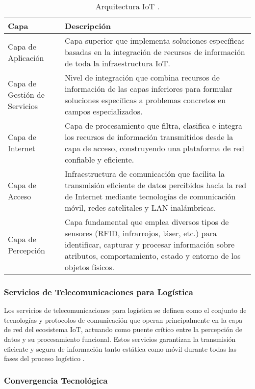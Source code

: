 \begin{table}[H]
\centering
\caption{Arquitectura IoT \cite{WebRef13248}.}
\label{tab:arquitectura_iot}
\begin{tabular}{@{}p{4cm}p{8cm}@{}}
\toprule
\textbf{Capa} & \textbf{Descripción} \\
\midrule
Capa de Aplicación & Capa superior que implementa soluciones específicas basadas en la integración de recursos de información de toda la infraestructura IoT. \\
\addlinespace
Capa de Gestión de Servicios & Nivel de integración que combina recursos de información de las capas inferiores para formular soluciones específicas a problemas concretos en campos especializados. \\
\addlinespace
Capa de Internet & Capa de procesamiento que filtra, clasifica e integra los recursos de información transmitidos desde la capa de acceso, construyendo una plataforma de red confiable y eficiente. \\
\addlinespace
Capa de Acceso & Infraestructura de comunicación que facilita la transmisión eficiente de datos percibidos hacia la red de Internet mediante tecnologías de comunicación móvil, redes satelitales y LAN inalámbricas. \\
\addlinespace
Capa de Percepción & Capa fundamental que emplea diversos tipos de sensores (RFID, infrarrojos, láser, etc.) para identificar, capturar y procesar información sobre atributos, comportamiento, estado y entorno de los objetos físicos. \\
\bottomrule
\end{tabular}
\end{table}

\subsubsection{Servicios de Telecomunicaciones para Logística}

Los servicios de telecomunicaciones para logística se definen como el conjunto de tecnologías y protocolos de comunicación que operan principalmente en la capa de red del ecosistema IoT, actuando como puente crítico entre la percepción de datos y su procesamiento funcional. Estos servicios garantizan la transmisión eficiente y segura de información tanto estática como móvil durante todas las fases del proceso logístico \cite{Zhou2022}.

\subsubsection{Convergencia Tecnológica}

